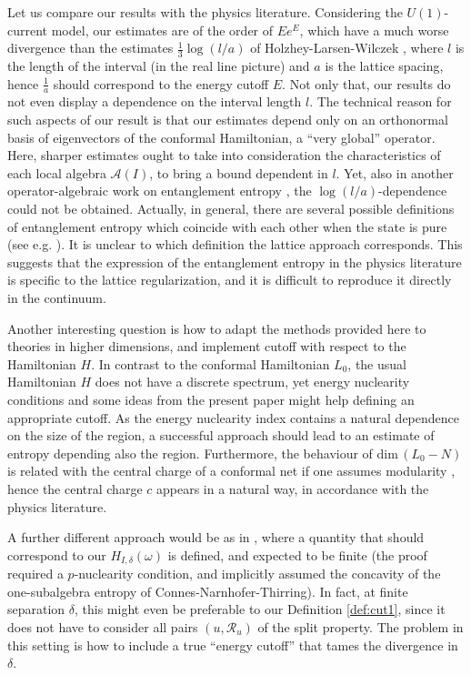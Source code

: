 \documentclass[a4paper,12pt]{article}
\theoremstyle{plain}
\theoremstyle{definition}
\theoremstyle{remark}
\def\A{{\mathcal A}}
\def\R{{\mathcal R}}
\def\R{{\mathcal R}}
\def\dim{\mathrm{dim}\,}
\begin{document}
Let us compare our results with the physics literature.
Considering the $U(1)$-current model, our estimates are of the order of $E e^E$, which have a much worse divergence
than the estimates $\frac13\log(l/a)$ of Holzhey-Larsen-Wilczek \cite{hlw94,calcar04}, where $l$ is the length of the interval
(in the real line picture) and $a$ is the lattice spacing, hence $\frac1a$ should correspond to the energy cutoff $E$.
Not only that, our results do not even display a dependence on the interval length $l$.
The technical reason for such aspects of our result is that our estimates depend only on an orthonormal basis
of eigenvectors of the conformal Hamiltonian, a ``very global'' operator.
Here, sharper estimates ought to take into consideration the characteristics of each local algebra $\A(I)$, to bring a bound dependent in $l$.
Yet, also in another operator-algebraic work on entanglement entropy \cite{HS17}, the $\log(l/a)$-dependence could not be obtained.
Actually, in general, there are several possible definitions of entanglement entropy
which coincide with each other when the state is pure (see e.g.\! \cite[Theorem 3]{VP98}).
It is unclear to which definition the lattice approach corresponds.
This suggests that the expression of the entanglement entropy in the physics literature is specific to the lattice regularization,
and it is difficult to reproduce it directly in the continuum.


Another interesting question is how to adapt the methods provided here to theories in higher dimensions,
and implement cutoff with respect to the Hamiltonian $H$.
In contrast to the conformal Hamiltonian $L_0$, the usual Hamiltonian $H$ does not have a discrete spectrum,
yet energy nuclearity conditions and some ideas from the present paper might help defining an appropriate cutoff.
As the energy nuclearity index contains a natural dependence on the size of the region,
a successful approach should lead to an estimate of entropy depending also the region.
Furthermore, the behaviour of $\dim (L_0 - N)$ is related with the central charge of a conformal net
if one assumes modularity \cite{KL05}, hence the central charge $c$ appears in a natural way, in accordance with the physics literature.

A further different approach would be as in \cite{narnhofer94}, where a quantity that should correspond to our $H_{I,\delta}(\omega)$ is defined,
and expected to be finite (the proof required a $p$-nuclearity condition, and implicitly assumed the concavity of the one-subalgebra entropy
of Connes-Narnhofer-Thirring). In fact, at finite separation $\delta$, this might even be preferable to our Definition \ref{def:cut1},
since it does not have to consider all pairs $(u,\R_u)$ of the split property. The problem in this setting
is how to include a true ``energy cutoff'' that tames the divergence in $\delta$. %
\end{document}
